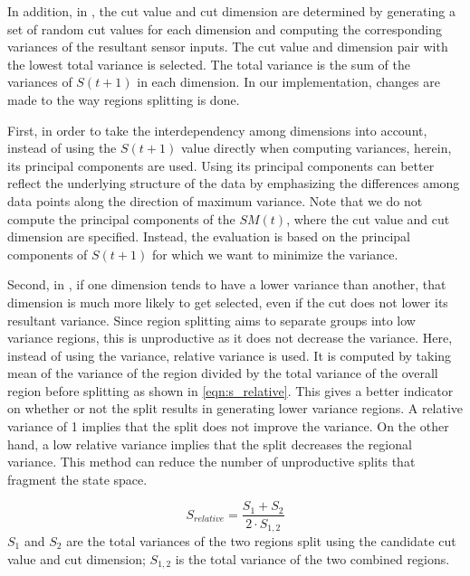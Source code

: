 In addition, in \cite{Oudeyer2007}, the cut value and cut dimension are determined by generating a set of random cut values for each dimension and computing the corresponding variances of the resultant sensor inputs. The cut value and dimension pair with the lowest total variance is selected. The total variance is the sum of the variances of $S(t+1)$ in each dimension. In our implementation, changes are made to the way regions splitting is done.

First, in order to take the interdependency among dimensions into account, instead of using the $S(t+1)$ value directly when computing variances, herein, its principal components are used. Using its principal components can better reflect the underlying structure of the data by emphasizing the differences among data points along the direction of maximum variance. Note that we do not compute the principal components of the $SM(t)$, where the cut value and cut dimension are specified. Instead, the evaluation is based on the principal components of $S(t+1)$ for which we want to minimize the variance. 

Second, in \cite{Oudeyer2007}, if one dimension tends to have a lower variance than another, that dimension is much more likely to get selected, even if the cut does not lower its resultant variance. Since region splitting aims to separate groups into low variance regions, this is unproductive as it does not decrease the variance. Here, instead of using the variance, relative variance is used. It is computed by taking mean of the variance of the region divided by the total variance of the overall region before splitting as shown in \eqref{eqn:s_relative}. This gives a better indicator on whether or not the split results in generating lower variance regions. A relative variance of 1 implies that the split does not improve the variance. On the other hand, a low relative variance implies that the split decreases the regional variance. This method can reduce the number of unproductive splits that fragment the state space. 

\begin{equation}\label{eqn:s_relative}
S_{relative} = \frac{S_1+S_2}{2 \cdot S_{1,2}}
\end{equation}
$S_1$ and $S_2$ are the total variances of the two regions split using the candidate cut value and cut dimension; $S_{1,2}$ is the total variance of the two combined regions.

